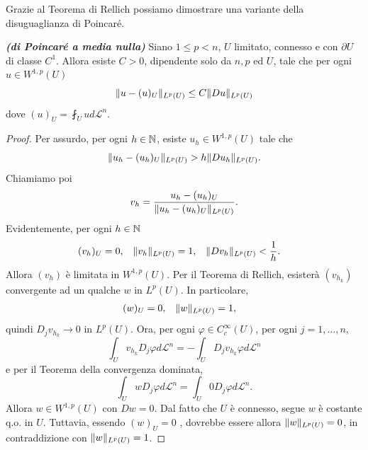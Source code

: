 Grazie al Teorema di Rellich possiamo dimostrare una variante della disuguaglianza di Poincaré.
\begin{teorema}\emph{\textbf{(di Poincaré a media nulla)}}\label{poincaréamedianulla}
	Siano $1 \le p < n$, $U$ limitato, connesso e con $\partial U$ di classe $C^1$. Allora esiste $C> 0$, dipendente solo da $n,p$ ed $U$, tale che per ogni $u \in W^{1,p}(U)$
	\[ \lVert u - (u)_{U}\rVert_{L^p(U)} \le C \lVert Du\rVert_{L^p(U)}\]
	dove $(u)_{U} = \fint_U u d\mathcal{L}^n$.
\end{teorema}
\begin{proof}
	Per assurdo, per ogni $h \in \mathbb{N}$, esiste $u_h \in W^{1,p}(U)$ tale che
	\[\lVert u_h - (u_h)_{U}\rVert_{L^p(U)} > h \lVert Du_h\rVert_{L^p(U)}.\]
	Chiamiamo poi 
	\[ v_h = \dfrac{u_h - (u_h)_{U}}{\lVert u_h - (u_h)_{U}\rVert_{L^p(U)}}. \]
	Evidentemente, per ogni $h \in \mathbb{N}$
	\begin{align*}
		(v_h)_{U} &= 0, & \lVert v_h\rVert_{L^p(U)} &= 1, & \lVert Dv_h\rVert_{L^p(U)} &< \frac{1}{h}.
	\end{align*}
	Allora $(v_h)$ è limitata in $W^{1,p}(U)$. Per il Teorema di Rellich, esisterà $(v_{h_k})$ convergente ad un qualche $w$ in $L^p(U)$. In particolare, 
	\begin{align*}
		(w)_{U} &= 0, & \lVert w\rVert_{L^p(U)} &= 1,
	\end{align*}
	quindi $D_j v_{h_k} \to 0$ in $L^p(U)$. 
	Ora, per ogni $\varphi \in C^\infty_c(U)$, per ogni $j = 1,\dots,n$,
	\[ \int_U v_{h_k} D_j \varphi d\mathcal{L}^n= - \int_U  D_jv_{h_k} \varphi d\mathcal{L}^n \]
	e per il Teorema della convergenza dominata,
	\[ \int_U w D_j \varphi d\mathcal{L}^n= \int_U0 D_j\varphi d\mathcal{L}^n. \]
	Allora $w \in W^{1,p}(U)$ con $Dw = 0$. Dal fatto che $U$ è connesso, segue $w$ è costante q.o. in $U$. Tuttavia, essendo $(w)_{U} = 0$ , dovrebbe essere allora $\lVert w\rVert_{L^p(U)} = 0$, in contraddizione con $\lVert w\rVert_{L^p(U)} = 1$.
\end{proof}

